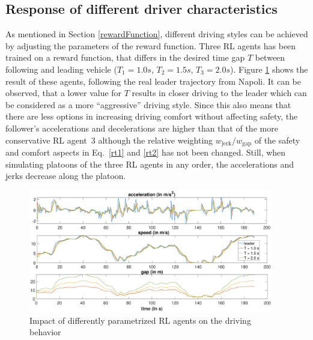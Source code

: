 \documentclass[review]{elsarticle}
\providecommand{\sub}[1]{_{\mathrm{#1}}}  %
\providecommand{\3}{{\ss}}
\begin{document}
\subsection{Response of different driver characteristics}
\label{sec:differentT}

As mentioned in Section \ref{rewardFunction}, different driving styles
can be achieved by adjusting the parameters of the reward
function. Three RL agents has been trained on a reward function, that
differs in the desired time gap $T$ between following and
leading vehicle ($T_{1} = 1.0s$, $T_{2} = 1.5s$, $T_{3} =
2.0s$). Figure \ref{fig:differentT} shows the result of these agents,
following the real leader trajectory from Napoli. It can be observed,
that a lower value for $T$ results in closer driving to the
leader which can be considered as a more ``aggressive''
driving style. Since this also means that there are less options in
increasing driving comfort without affecting safety, the follower's
accelerations and decelerations are higher than that of the more
conservative RL agent~3 although the relative
weighting $w\sub{jerk}/w\sub{gap}$ of the safety and comfort aspects in Eq.~\eqref{rt1} and \eqref{rt2} has not been
changed. Still, when simulating platoons of the three RL
  agents in any order, the accelerations and jerks decrease along the
  platoon.

\begin{figure}
	\centering
	\includegraphics[width=0.95\textwidth]{images/differentT}
	\caption{Impact of differently parametrized RL agents
          on the driving behavior }
	\label{fig:differentT}
\end{figure}
\end{document}

